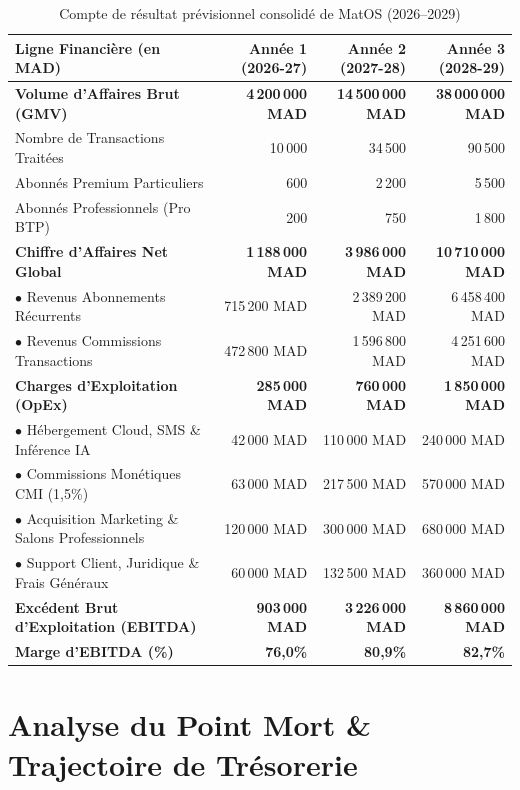 \documentclass[11pt,a4paper]{report}
\begin{document}
\begin{table}[h!]
\centering
\small
\begin{tabularx}{\textwidth}{l r r r}
\toprule
\textbf{Ligne Financière (en MAD)} & \textbf{Année 1 (2026-27)} & \textbf{Année 2 (2027-28)} & \textbf{Année 3 (2028-29)} \\
\midrule
\textbf{Volume d'Affaires Brut (GMV)} & \textbf{4\,200\,000 MAD} & \textbf{14\,500\,000 MAD} & \textbf{38\,000\,000 MAD} \\
Nombre de Transactions Traitées & 10\,000 & 34\,500 & 90\,500 \\
Abonnés Premium Particuliers & 600 & 2\,200 & 5\,500 \\
Abonnés Professionnels (Pro BTP) & 200 & 750 & 1\,800 \\
\midrule
\textbf{Chiffre d'Affaires Net Global} & \textbf{1\,188\,000 MAD} & \textbf{3\,986\,000 MAD} & \textbf{10\,710\,000 MAD} \\
$\bullet$ Revenus Abonnements Récurrents & 715\,200 MAD & 2\,389\,200 MAD & 6\,458\,400 MAD \\
$\bullet$ Revenus Commissions Transactions & 472\,800 MAD & 1\,596\,800 MAD & 4\,251\,600 MAD \\
\midrule
\textbf{Charges d'Exploitation (OpEx)} & \textbf{285\,000 MAD} & \textbf{760\,000 MAD} & \textbf{1\,850\,000 MAD} \\
$\bullet$ Hébergement Cloud, SMS \& Inférence IA & 42\,000 MAD & 110\,000 MAD & 240\,000 MAD \\
$\bullet$ Commissions Monétiques CMI (1,5\%) & 63\,000 MAD & 217\,500 MAD & 570\,000 MAD \\
$\bullet$ Acquisition Marketing \& Salons Professionnels & 120\,000 MAD & 300\,000 MAD & 680\,000 MAD \\
$\bullet$ Support Client, Juridique \& Frais Généraux & 60\,000 MAD & 132\,500 MAD & 360\,000 MAD \\
\midrule
\textbf{Excédent Brut d'Exploitation (EBITDA)} & \textbf{903\,000 MAD} & \textbf{3\,226\,000 MAD} & \textbf{8\,860\,000 MAD} \\
\textbf{Marge d'EBITDA (\%)} & \textbf{76,0\%} & \textbf{80,9\%} & \textbf{82,7\%} \\
\bottomrule
\end{tabularx}
\caption{Compte de résultat prévisionnel consolidé de MatOS (2026--2029)}
\end{table}

\chapter{Analyse du Point Mort \& Trajectoire de Trésorerie}
\end{document}
